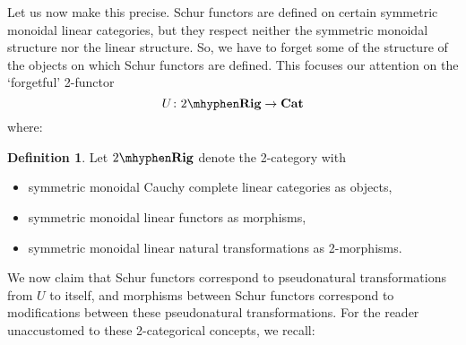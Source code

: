 \documentclass[12pt,reqno]{amsart}
\theoremstyle{plain}
\theoremstyle{definition}
\newtheorem{defn}[thm]{Definition}
\theoremstyle{remark}
\newcommand{\maps}{\colon}
\newcommand{\TRig}{2\mhyphen\namedbicat{Rig}}
\newcommand{\namedbicat}[1]{\mathbf{#1}}
\newcommand{\CCat}{\namedbicat{Cat}}
\numberwithin{thm}{section}
\begin{document}
Let us now make this precise. Schur functors are defined on certain symmetric monoidal linear categories, but they respect neither the symmetric monoidal structure nor the linear structure. So, we have to forget some of the structure of the objects on which Schur functors are defined. This focuses our attention on the `forgetful' 2-functor
\[
    U \maps \TRig \to \CCat
\] 
where:
\begin{defn}
\label{defn:2-rig}
    Let $\TRig$ denote the 2-category with
    \begin{itemize}
        \item symmetric monoidal Cauchy complete linear categories as objects, 
        \item symmetric monoidal linear functors as morphisms, 
        \item symmetric monoidal linear natural transformations as 2-morphisms.
    \end{itemize}
\end{defn}
We now claim that Schur functors correspond to pseudonatural transformations from $U$ to itself, and morphisms between Schur functors correspond to modifications between these pseudonatural transformations. For the reader unaccustomed to these 2-categorical concepts, we recall:
\end{document}
